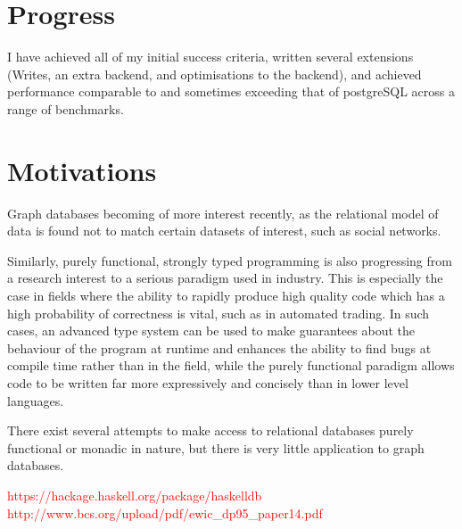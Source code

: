 \documentclass[12pt,a4paper,twoside,openright]{report}
\newcommand\todo[1]{\textcolor{red}{#1}}
\begin{document}
\section{Progress}

I have achieved all of my initial success criteria, written several extensions (Writes, an extra backend, and optimisations to the backend), and achieved performance comparable to and sometimes exceeding that of postgreSQL across a range of benchmarks.

\section{Motivations}

Graph databases becoming of more interest recently, as the relational model of data is found not to match certain datasets of interest, such as social networks.

Similarly, purely functional, strongly typed programming is also progressing from a research interest to a serious paradigm used in industry. This is especially the case in fields where the ability to rapidly produce high quality code which has a high probability of correctness is vital, such as in automated trading. In such cases, an advanced type system can be used to make guarantees about the behaviour of the program at runtime and enhances the ability to find bugs at compile time rather than in the field, while the purely functional paradigm allows code to be written far more expressively and concisely than in lower level languages.

There exist several attempts to make access to relational databases purely functional or monadic in nature, but there is very little application to  graph databases.
    
    \todo{https://hackage.haskell.org/package/haskelldb
		  http://www.bcs.org/upload/pdf/ewic_dp95_paper14.pdf}
\end{document}
